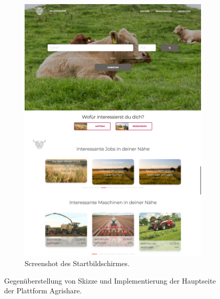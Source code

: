 \begin{figure}
\begin{subfigure}[b]{0.45\textwidth}
        \includegraphics[width=\textwidth]{99_IMG/03_Umsetzung/homeScreenshot.png}
        \caption{Screenshot des Startbildschirmes.}
        \label{fig:mapScreenshot}
    \end{subfigure}
    \caption{Gegenüberstellung von Skizze und Implementierung der Hauptseite der Plattform Agrishare.}\label{fig:homeView}
\end{figure}

